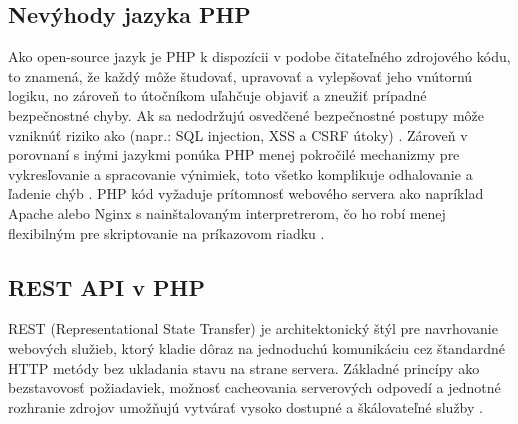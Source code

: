 \subsection{Nevýhody jazyka PHP}
Ako open-source jazyk je PHP k dispozícii v podobe čitateľného zdrojového kódu, to znamená, že každý môže študovať, 
upravovať a vylepšovať jeho vnútornú logiku, no zároveň to útočníkom uľahčuje objaviť a zneužiť prípadné bezpečnostné 
chyby. Ak sa nedodržujú osvedčené bezpečnostné postupy môže vzniknúť riziko ako (napr.: SQL injection, XSS a CSRF 
útoky) \cite{tutorialspoint_php_introduction}. Zároveň v porovnaní s inými jazykmi ponúka PHP menej pokročilé mechanizmy pre 
vykresľovanie a spracovanie výnimiek, toto všetko komplikuje odhalovanie a ľadenie chýb \cite{geeksforgeeks_php_vs_aspnet}.
PHP kód vyžaduje prítomnosť webového servera ako napríklad Apache alebo Nginx s nainštalovaným interpretrerom, čo ho robí menej 
flexibilným pre skriptovanie na príkazovom riadku \cite{tutorialspoint_php_introduction}.

\subsection{REST API v PHP}

REST (Representational State Transfer) je architektonický štýl pre navrhovanie webových služieb, ktorý kladie dôraz na 
jednoduchú komunikáciu cez štandardné HTTP metódy bez ukladania stavu na strane servera. Základné princípy ako bezstavovosť 
požiadaviek, možnosť cacheovania serverových odpovedí a jednotné rozhranie zdrojov umožňujú vytvárať vysoko dostupné a 
škálovateľné služby \cite{redhat_rest_api}.

